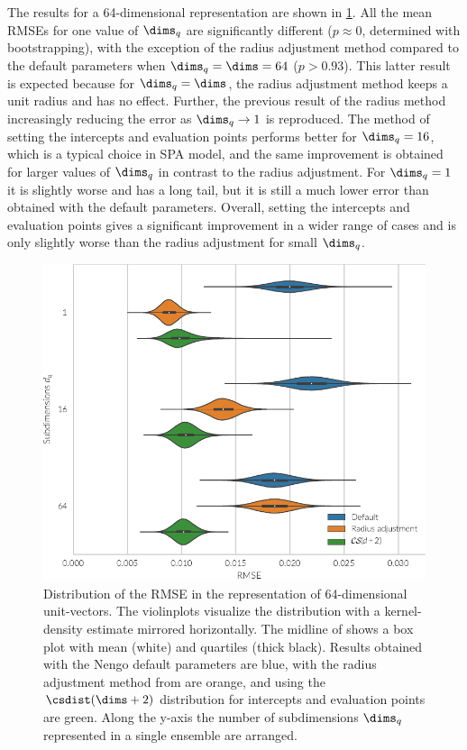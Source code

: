 The results for a 64-dimensional representation are shown in \cref{fig:spaopt-repr}.
All the mean RMSEs for one value of $\dims_q$ are significantly different ($p \approx 0$,
determined with bootstrapping), with the exception of the radius adjustment method compared to the default parameters when $\dims_q = \dims = 64$ ($p > 0.93$).
This latter result is expected because for $\dims_q = \dims$, the radius adjustment method keeps a unit radius and has no effect.
Further, the previous result of the radius method increasingly reducing the error as $\dims_q \rightarrow 1$ is reproduced.
The method of setting the intercepts and evaluation points performs better for $\dims_q = 16$, which is a typical choice in SPA model, and the same improvement is obtained for larger values of $\dims_q$ in contrast to the radius adjustment.
For $\dims_q = 1$ it is slightly worse and has a long tail, but it is still a much lower error than obtained with the default parameters.
Overall, setting the intercepts and evaluation points gives a significant improvement in a wider range of cases and is only slightly worse than the radius adjustment for small $\dims_q$.
\begin{figure}
    \centering
    \includegraphics{figures/spaopt-repr}
    \caption[Distribution of the RMSE in the representation of unit-vectors]{Distribution of the RMSE in the representation of 64-dimensional unit-vectors. The violinplots visualize the distribution with a kernel-density estimate mirrored horizontally. The midline of shows a box plot with mean (white) and quartiles (thick black). Results obtained with the Nengo default parameters are blue, with the radius adjustment method from \textcite{gosmann216} are orange, and using the $\csdist(\dims + 2)$ distribution for intercepts and evaluation points are green. Along the y-axis the number of subdimensions $\dims_q$ represented in a single ensemble are arranged.}\label{fig:spaopt-repr}
\end{figure}


